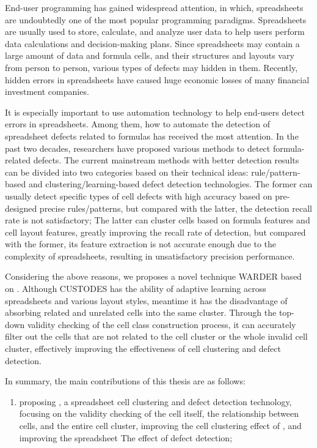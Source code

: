 \begin{englishabstract}

End-user programming has gained widespread attention, in which, spreadsheets are undoubtedly one of the most popular programming paradigms.
Spreadsheets are usually used to store, calculate, and analyze user data to help users perform data calculations and decision-making plans.
Since spreadsheets may contain a large amount of data and formula cells, and their structures and layouts vary from person to person, various types of defects may hidden in them.
Recently, hidden errors in spreadsheets have caused huge economic losses of many financial investment companies.

It is especially important to use automation technology to help end-users detect errors in spreadsheets.
Among them, how to automate the detection of spreadsheet defects related to formulas has received the most attention.
In the past two decades, researchers have proposed various methods to detect formula-related defects.
The current mainstream methods with better detection results can be divided into two categories based on their technical ideas: rule/pattern-based and clustering/learning-based defect detection technologies.
The former can usually detect specific types of cell defects with high accuracy based on pre-designed precise rules/patterns, but compared with the latter, the detection recall rate is not satisfactory;
The latter can cluster cells based on formula features and cell layout features, greatly improving the recall rate of detection, but compared with the former, its feature extraction is not accurate enough due to the complexity of spreadsheets, resulting in unsatisfactory precision performance.

Considering the above reasons, we proposes a novel technique WARDER based on \cu.
Although CUSTODES has the ability of adaptive learning across spreadsheets and various layout styles, meantime it has the disadvantage of absorbing related and unrelated cells into the same cluster.
Through the top-down validity checking of the cell class construction process, it can accurately filter out the cells that are not related to the cell cluster or the whole invalid cell cluster, effectively improving the effectiveness of cell clustering and defect detection.

In summary, the main contributions of this thesis are as follows:
\begin{enumerate}
    \item proposing \wa , a spreadsheet cell clustering and defect detection technology, focusing on the validity checking of the cell itself, the relationship between cells, and the entire cell cluster, improving the cell clustering effect of \cu , and improving the spreadsheet The effect of defect detection;
    

\end{enumerate}
\end{englishabstract}
